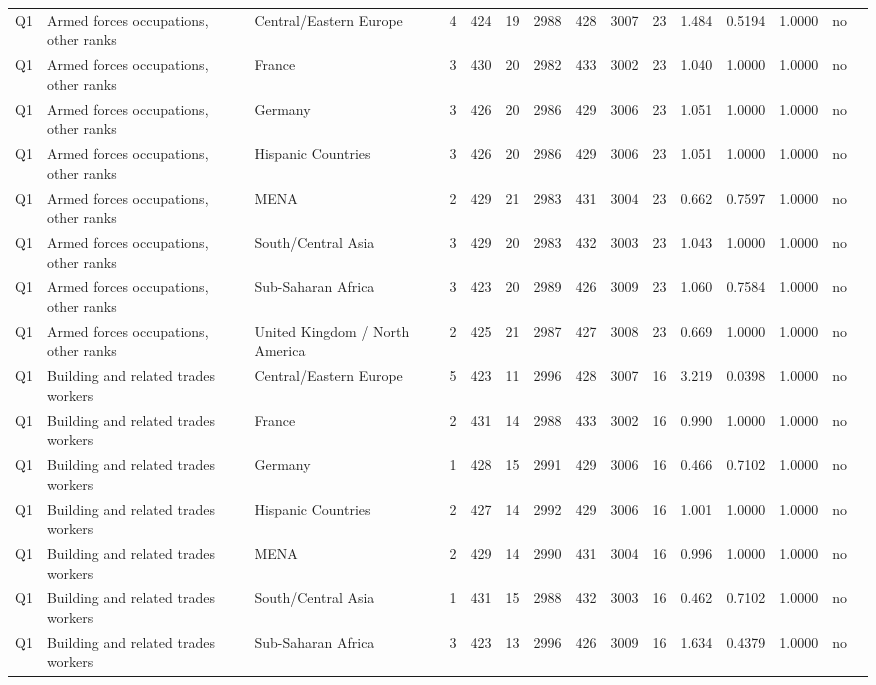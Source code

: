 \begin{longtable}{lllrcccccccccll}
Q1 & Armed forces occupations, other ranks & Central/Eastern Europe & 4 & 424 & 19 & 2988 & 428 & 3007 & 23 & 1.484 & 0.5194 & 1.0000 & no \\
Q1 & Armed forces occupations, other ranks & France & 3 & 430 & 20 & 2982 & 433 & 3002 & 23 & 1.040 & 1.0000 & 1.0000 & no \\
Q1 & Armed forces occupations, other ranks & Germany & 3 & 426 & 20 & 2986 & 429 & 3006 & 23 & 1.051 & 1.0000 & 1.0000 & no \\
Q1 & Armed forces occupations, other ranks & Hispanic Countries & 3 & 426 & 20 & 2986 & 429 & 3006 & 23 & 1.051 & 1.0000 & 1.0000 & no \\
Q1 & Armed forces occupations, other ranks & MENA & 2 & 429 & 21 & 2983 & 431 & 3004 & 23 & 0.662 & 0.7597 & 1.0000 & no \\
Q1 & Armed forces occupations, other ranks & South/Central Asia & 3 & 429 & 20 & 2983 & 432 & 3003 & 23 & 1.043 & 1.0000 & 1.0000 & no \\
Q1 & Armed forces occupations, other ranks & Sub-Saharan Africa & 3 & 423 & 20 & 2989 & 426 & 3009 & 23 & 1.060 & 0.7584 & 1.0000 & no \\
Q1 & Armed forces occupations, other ranks & United Kingdom / North America & 2 & 425 & 21 & 2987 & 427 & 3008 & 23 & 0.669 & 1.0000 & 1.0000 & no \\
Q1 & Building and related trades workers & Central/Eastern Europe & 5 & 423 & 11 & 2996 & 428 & 3007 & 16 & 3.219 & 0.0398 & 1.0000 & no \\
Q1 & Building and related trades workers & France & 2 & 431 & 14 & 2988 & 433 & 3002 & 16 & 0.990 & 1.0000 & 1.0000 & no \\
Q1 & Building and related trades workers & Germany & 1 & 428 & 15 & 2991 & 429 & 3006 & 16 & 0.466 & 0.7102 & 1.0000 & no \\
Q1 & Building and related trades workers & Hispanic Countries & 2 & 427 & 14 & 2992 & 429 & 3006 & 16 & 1.001 & 1.0000 & 1.0000 & no \\
Q1 & Building and related trades workers & MENA & 2 & 429 & 14 & 2990 & 431 & 3004 & 16 & 0.996 & 1.0000 & 1.0000 & no \\
Q1 & Building and related trades workers & South/Central Asia & 1 & 431 & 15 & 2988 & 432 & 3003 & 16 & 0.462 & 0.7102 & 1.0000 & no \\
Q1 & Building and related trades workers & Sub-Saharan Africa & 3 & 423 & 13 & 2996 & 426 & 3009 & 16 & 1.634 & 0.4379 & 1.0000 & no \\

\end{longtable}
